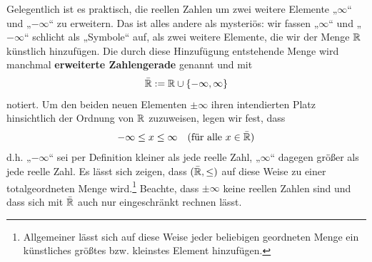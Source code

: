\begin{defin} \label{def:erweitertezahlengerade} 
    Gelegentlich ist es praktisch, die reellen Zahlen um zwei weitere Elemente „$\infty$“ und „$-\infty$“ zu erweitern. Das ist alles andere als mysteriös: wir fassen „$\infty$“ und „$-\infty$“ schlicht als „Symbole“ auf, als zwei weitere Elemente, die wir der Menge $\mathbb R$ künstlich hinzufügen. Die durch diese Hinzufügung entstehende Menge wird manchmal \textbf{erweiterte Zahlengerade} genannt und mit
        \[ \bar{\mathbb R} := \mathbb R\cup \{-\infty,\infty\} \]
    notiert. Um den beiden neuen Elementen $\pm \infty$ ihren intendierten Platz hinsichtlich der Ordnung von $\mathbb R$ zuzuweisen, legen wir fest, dass
        \begin{align*}
            -\infty \le  x \le \infty && (\text{für alle $x\in \bar {\mathbb R}$})
        \end{align*}
    d.h. „$-\infty$“ sei per Definition kleiner als jede reelle Zahl, „$\infty$“ dagegen größer als jede reelle Zahl. Es lässt sich zeigen, dass $(\bar {\mathbb R},\le)$ auf diese Weise zu einer totalgeordneten Menge wird.\footnote{Allgemeiner lässt sich auf diese Weise jeder beliebigen geordneten Menge ein künstliches größtes bzw. kleinstes Element hinzufügen.} Beachte, dass $\pm \infty$ keine reellen Zahlen sind und dass sich mit $\bar{\mathbb R}$ auch nur eingeschränkt rechnen lässt.
\end{defin}


